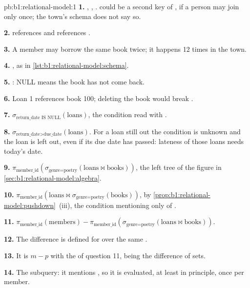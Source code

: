 \begin{solution}{pb:b1:relational-model:1}
\textbf{1.} , , .  could be a second key of
, if a person may join only once; the town's schema does not say so.

\textbf{2.}  references  and  references .

\textbf{3.} A member may borrow the same book twice; it happens 12 times in the town.

\textbf{4.} , as in \cref{lst:b1:relational-model:schema}.

\textbf{5.} : NULL means the book has not come back.

\textbf{6.} Loan 1 references book 100; deleting the book would break .

\textbf{7.} $\sigma_{\text{return\_date IS NULL}}(\text{loans})$, the condition read with .

\textbf{8.} $\sigma_{\text{return\_date} > \text{due\_date}}(\text{loans})$. For a loan still out the condition is unknown
and the loan is left out, even if its due date has passed: lateness of those loans needs today's date.

\textbf{9.} $\pi_{\text{member\_id}}(\sigma_{\text{genre} = \text{poetry}}(\text{loans} \bowtie \text{books}))$, the left
tree of the figure in \cref{sec:b1:relational-model:algebra}.

\textbf{10.} $\pi_{\text{member\_id}}(\text{loans} \bowtie \sigma_{\text{genre} = \text{poetry}}(\text{books}))$, by
\cref{prop:b1:relational-model:pushdown}~(iii), the condition mentioning only  of .

\textbf{11.} $\pi_{\text{member\_id}}(\text{members}) - \pi_{\text{member\_id}}(\sigma_{\text{genre} =
\text{poetry}}(\text{loans} \bowtie \text{books}))$.

\textbf{12.} The difference is defined for  over the same .

\textbf{13.} It is $m - p$ with the  of question 11,  being the difference of sets.

\textbf{14.} The subquery: it mentions , so it is evaluated, at least in principle, once per member.


\end{solution}
